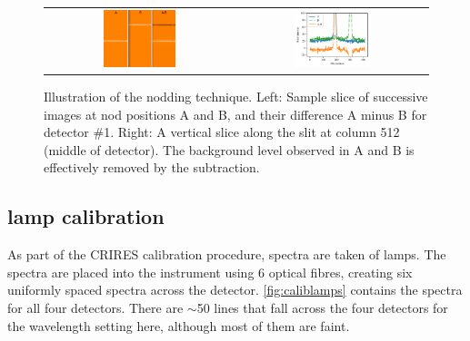 \begin{figure}
    \centering
    \begin{tabular}{cc}    %
       \includegraphics[width=0.4\textwidth]{figures/reduction/Nods_AB_A-B_labelled.png} & \includegraphics[width=0.42\textwidth]{figures/reduction/nod_slice_example.pdf} \\
    \end{tabular}
    \caption[Illustration of the nodding technique.]{Illustration of the nodding technique.
        Left: Sample slice of successive images at nod positions A and B, and their difference A minus B for detector \#1.
        Right: A vertical slice along the slit at column 512 (middle of detector).
        The background level observed in A and B is effectively removed by the subtraction.}
    \label{fig:nodimages}
\end{figure}

\subsection{\thar{} lamp calibration}
\label{subsec:th-ar}
As part of the {CRIRES} calibration procedure, spectra are taken of \thar{} lamps.
The \thar{} spectra are placed into the instrument using 6 optical fibres, creating six uniformly spaced spectra across the detector.
\cref{fig:caliblamps} contains the \thar{} spectra for all four detectors.
There are \(\sim\)50 \thar{} lines that fall across the four detectors for the wavelength setting here, although most of them are faint.

